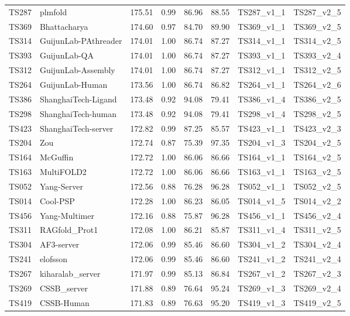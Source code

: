 \begin{table}[ht]
{\begin{tabular}{llllllll}
TS287 & plmfold & 175.51 & 0.99 & 86.96 & 88.55 & TS287\_v1\_1 & TS287\_v2\_5 \\ 
TS369 & Bhattacharya & 174.60 & 0.97 & 84.70 & 89.90 & TS369\_v1\_1 & TS369\_v2\_5 \\ 
TS314 & GuijunLab-PAthreader & 174.01 & 1.00 & 86.74 & 87.27 & TS314\_v1\_1 & TS314\_v2\_5 \\ 
TS393 & GuijunLab-QA & 174.01 & 1.00 & 86.74 & 87.27 & TS393\_v1\_1 & TS393\_v2\_4 \\ 
TS312 & GuijunLab-Assembly & 174.01 & 1.00 & 86.74 & 87.27 & TS312\_v1\_1 & TS312\_v2\_5 \\ 
TS264 & GuijunLab-Human & 173.56 & 1.00 & 86.74 & 86.82 & TS264\_v1\_1 & TS264\_v2\_6 \\ 
TS386 & ShanghaiTech-Ligand & 173.48 & 0.92 & 94.08 & 79.41 & TS386\_v1\_4 & TS386\_v2\_5 \\ 
TS298 & ShanghaiTech-human & 173.48 & 0.92 & 94.08 & 79.41 & TS298\_v1\_4 & TS298\_v2\_5 \\ 
TS423 & ShanghaiTech-server & 172.82 & 0.99 & 87.25 & 85.57 & TS423\_v1\_1 & TS423\_v2\_3 \\ 
TS204 & Zou & 172.74 & 0.87 & 75.39 & 97.35 & TS204\_v1\_3 & TS204\_v2\_5 \\ 
TS164 & McGuffin & 172.72 & 1.00 & 86.06 & 86.66 & TS164\_v1\_1 & TS164\_v2\_5 \\ 
TS163 & MultiFOLD2 & 172.72 & 1.00 & 86.06 & 86.66 & TS163\_v1\_1 & TS163\_v2\_5 \\ 
TS052 & Yang-Server & 172.56 & 0.88 & 76.28 & 96.28 & TS052\_v1\_1 & TS052\_v2\_5 \\ 
TS014 & Cool-PSP & 172.28 & 1.00 & 86.23 & 86.05 & TS014\_v1\_5 & TS014\_v2\_2 \\ 
TS456 & Yang-Multimer & 172.16 & 0.88 & 75.87 & 96.28 & TS456\_v1\_1 & TS456\_v2\_4 \\ 
TS311 & RAGfold\_Prot1 & 172.08 & 1.00 & 86.21 & 85.87 & TS311\_v1\_4 & TS311\_v2\_5 \\ 
TS304 & AF3-server & 172.06 & 0.99 & 85.46 & 86.60 & TS304\_v1\_2 & TS304\_v2\_4 \\ 
TS241 & elofsson & 172.06 & 0.99 & 85.46 & 86.60 & TS241\_v1\_2 & TS241\_v2\_4 \\ 
TS267 & kiharalab\_server & 171.97 & 0.99 & 85.13 & 86.84 & TS267\_v1\_2 & TS267\_v2\_3 \\ 
TS269 & CSSB\_server & 171.88 & 0.89 & 76.64 & 95.24 & TS269\_v1\_3 & TS269\_v2\_4 \\ 
TS419 & CSSB-Human & 171.83 & 0.89 & 76.63 & 95.20 & TS419\_v1\_3 & TS419\_v2\_5 \\ 

\end{tabular}}
\end{table}
